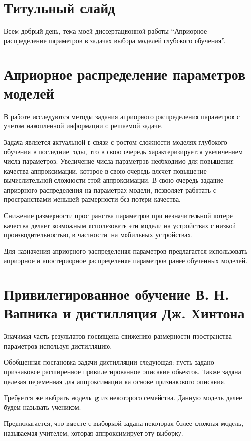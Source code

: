 \documentclass[10pt, twoside]{article}
\begin{document}
\section{Титульный слайд}
Всем добрый день, тема моей диссертационной работы ``Априорное распределение параметров в задачах выбора моделей глубокого обучения''.

\section{Априорное распределение параметров моделей}
В работе исследуются методы задания априорного распределения параметров с учетом накопленной информации о решаемой задаче.

Задача является актуальной в связи с ростом сложности моделях глубокого обучения в последние годы, что в свою очередь характеризируется увеличением числа параметров. Увеличение числа параметров  необходимо для повышения качества аппроксимации, которое в свою очередь влечет повышение вычислительной сложности этой аппроксимации. В свою очередь задание априорного распределения на параметрах модели, позволяет работать с пространствами меньшей размерности без потери качества.

Снижение размерности пространства параметров при незначительной потере качества делает возможным использовать эти модели на устройствах с низкой производительностью, в частности, на мобильных устройствах.

Для назначения априорного распределения параметров предлагается использовать априорное и апостериорное распределение параметров ранее обученных моделей.

\section{Привилегированное обучение В. Н. Вапника и дистилляция Дж. Хинтона}
Значимая часть результатов посвящена снижению размерности пространства параметров используя дистилляцию.

Обобщенная постановка задачи дистилляции следующая: пусть задано признаковое расширенное привилегированное описание объектов. Также задана целевая переменная для аппроксимации на основе признакового описания.

Требуется же выбрать модель~$\mathbf{g}$ из некоторого семейства. Данную модель далее будем называть учеником.

Предполагается, что вместе с выборкой задана некоторая более сложная модель, называемая учителем, которая аппроксимирует эту выборку.
\end{document}
